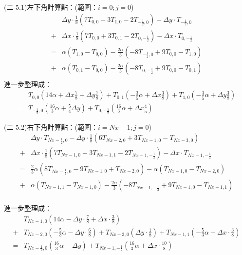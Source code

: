 \documentclass[12pt]{article}
\begin{document}
\noindent (二-5.1)左下角計算點：(範圍：$i = 0 ; j = 0$)\\
\begin{equation}
\begin{split}
    &\Delta y \cdot \frac{1}{8}\left(7T_{0,0}+3T_{1,0}-2T_{-\frac{1}{2},0}\right)  
    -\Delta y \cdot T_{-\frac{1}{2},0}\\
   +&\Delta x \cdot \frac{1}{8}\left(7T_{0,0}+3T_{0,1}-2T_{0,-\frac{1}{2}}\right)  
   -\Delta x \cdot T_{0,-\frac{1}{2}}\\
   =& \alpha (T_{1,0}-T_{0,0})-  \frac{2\alpha}{3} (-8T_{-\frac{1}{2},0}+9T_{0,0}-T_{1,0})\\
   +& \alpha (T_{0,1}-T_{0,0}) -  \frac{2\alpha}{3} (-8T_{0,-\frac{1}{2}}+ 9T_{0,0}-T_{0,1})\\
\end{split}
\end{equation}
\noindent 進一步整理成：
\begin{equation}
\begin{split}
   &T_{0,0}(14\alpha +\Delta x \frac{7}{8} + \Delta y \frac{7}{8})+T_{0,1}(-\frac{3}{5}\alpha + \Delta x \frac{3}{8})+T_{1,0}(-\frac{3}{5}\alpha +\Delta y \frac{3}{8})\\
   = &T_{-\frac{1}{2},0}(\frac{16}{3}\alpha + \frac{5}{4}\Delta y )+T_{0,-\frac{1}{2}}(\frac{16}{3}\alpha + \Delta x \frac{4}{5 })
\end{split}
\end{equation}

\noindent (二-5.2)右下角計算點：(範圍：$i = Nx-1 ; j = 0$)\\
\begin{equation}
  \begin{split}
    &\Delta y \cdot T_{Nx-\frac{1}{2},0}  
  -  \Delta y \cdot \frac{1}{8}\left(6T_{Nx-2,0}+3T_{Nx-1,0}-T_{Nx-3,0}\right) \\
  + &\Delta x \cdot \frac{1}{8}\left(7T_{Nx-1,0}+3T_{Nx-1,1}-2T_{Nx-1,-\frac{1}{2}}\right)  
  -  \Delta x \cdot T_{Nx-1,-\frac{1}{2}}\\
  = &\frac{2}{3}\alpha (8T_{Nx-\frac{1}{2},0}-9T_{Nx-1,0}+T_{Nx-2,0})-  \alpha (T_{Nx-1,0}-T_{Nx-2,0})\\
  + &\alpha (T_{Nx-1,1}-T_{Nx-1,0}) -  \frac{2\alpha}{3} (-8T_{Nx-1,-\frac{1}{2}}+ 9T_{Nx-1,0}-T_{Nx-1,1})\\
  \end{split}
\end{equation}

\noindent 進一步整理成：
\begin{equation}
  \begin{split}
    &T_{Nx-1,0}(14\alpha-  \Delta y \cdot \frac{7}{8}+\Delta x \cdot \frac{3}{8})\\
    + & T_{Nx-2,0}(-\frac{5}{3}\alpha-  \Delta y \cdot \frac{6}{8})+T_{Nx-3,0}(\Delta y \cdot \frac{1}{8}) + T_{Nx-1,1}(-\frac{5}{3}\alpha+ \Delta x \cdot \frac{3}{8})\\
    = &T_{Nx-\frac{1}{2},0}(\frac{16}{3}\alpha - \Delta y)+T_{Nx-1,-\frac{1}{2}}(\frac{16}{3}\alpha+\Delta x \cdot \frac{10}{8}) \\
  \end{split}
\end{equation}
\end{document}
